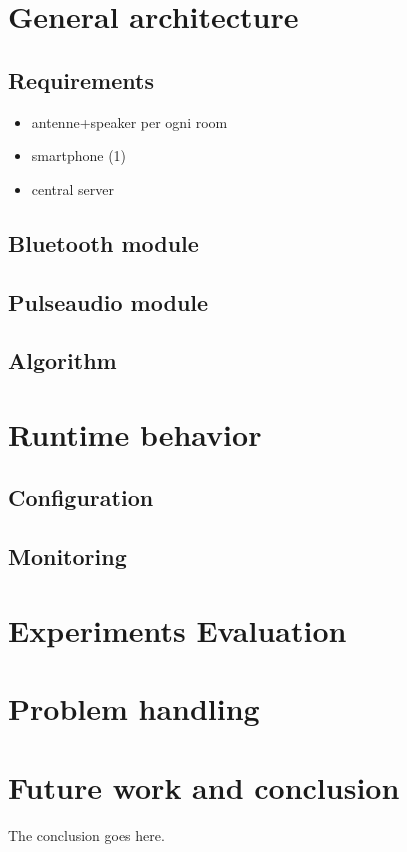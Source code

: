 \documentclass[conference]{./IEEEtran}
\begin{document}
\section{General architecture}
\subsection{Requirements}
\begin{itemize}
\item antenne+speaker per ogni room
\item smartphone (1)
\item central server
\end{itemize}

\subsection{Bluetooth module}
\subsection{Pulseaudio module}
\subsection{Algorithm}



\section{Runtime behavior}
\subsection{Configuration}
\subsection{Monitoring}


\section{Experiments Evaluation}

\section{Problem handling}

\section{Future work and conclusion}
The conclusion goes here.
\end{document}
